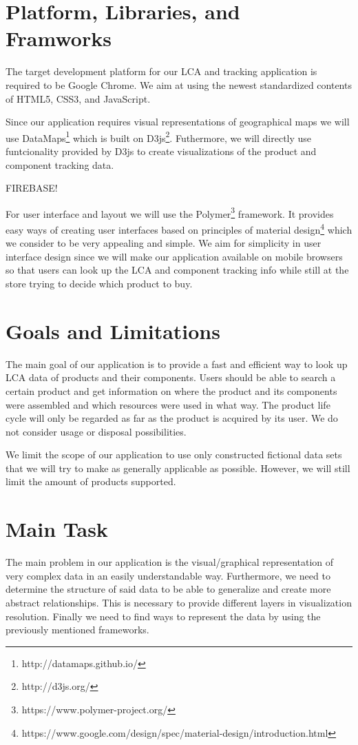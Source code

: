\documentclass[a4page]{article}
\begin{document}
\section{Platform, Libraries, and Framworks}
The target development platform for our \ac{LCA} and tracking application is required to be Google Chrome. 
We aim at using the newest standardized contents of HTML5, CSS3, and JavaScript.

Since our application requires visual representations of geographical maps we will use DataMaps\footnote{http://datamaps.github.io/} which is built on D3js\footnote{http://d3js.org/}.
Futhermore, we will directly use funtcionality provided by D3js to create visualizations of the product and component tracking data.

FIREBASE!

For user interface and layout we will use the Polymer\footnote{https://www.polymer-project.org/} framework. 
It provides easy ways of creating user interfaces based on principles of material design\footnote{https://www.google.com/design/spec/material-design/introduction.html} which we consider to be very appealing and simple.
We aim for simplicity in user interface design since we will make our application available on mobile browsers so that users can look up the \ac{LCA} and component tracking info while still at the store trying to decide which product to buy.

\section{Goals and Limitations}
The main goal of our application is to provide a fast and efficient way to look up \ac{LCA} data of products and their components.
Users should be able to search a certain product and get information on where the product and its components were assembled and which resources were used in what way.
The product life cycle will only be regarded as far as the product is acquired by its user.
We do not consider usage or disposal possibilities. 

We limit the scope of our application to use only constructed fictional data sets that we will try to make as generally applicable as possible.
However, we will still limit the amount of products supported.

\section{Main Task}
The main problem in our application is the visual/graphical representation of very complex data in an easily understandable way.
Furthermore, we need to determine the structure of said data to be able to generalize and create more abstract relationships.
This is necessary to provide different layers in visualization resolution.
Finally we need to find ways to represent the data by using the previously mentioned frameworks.
\end{document}
